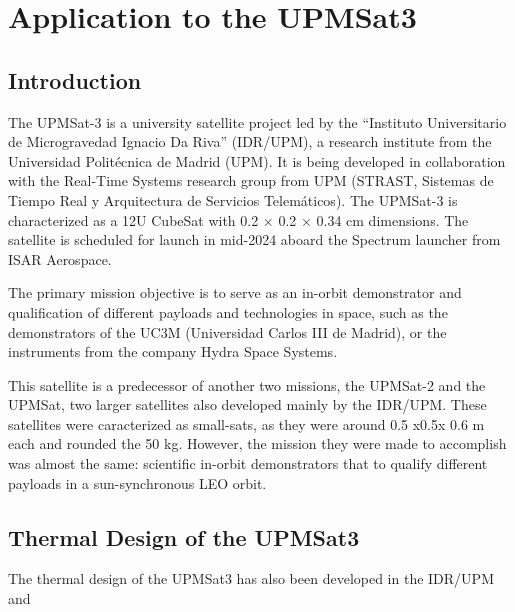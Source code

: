 \chapter{Application to the UPMSat3}\label{ch:04}
\section{Introduction}

The UPMSat-3 is a university satellite project led by the “Instituto Universitario de Microgravedad  Ignacio Da Riva” (IDR/UPM), a research institute from the Universidad Politécnica de Madrid (UPM). It is being developed in collaboration with the Real-Time Systems research group from UPM (STRAST, Sistemas de Tiempo Real y Arquitectura de Servicios Telemáticos). The UPMSat-3 is characterized as a 12U CubeSat with 0.2 × 0.2 × 0.34 cm dimensions. The satellite is scheduled for launch in mid-2024 aboard the Spectrum launcher from ISAR Aerospace. 

The primary mission objective is to serve as an in-orbit demonstrator and qualification of
different payloads and technologies in space, such as the demonstrators of the UC3M (Universidad Carlos III de Madrid), or the instruments from the company Hydra Space Systems.

This satellite is a predecessor of another two missions, the UPMSat-2 and the UPMSat, two larger satellites also developed mainly by the IDR/UPM. These satellites were caracterized as small-sats, as they were around 0.5 x0.5x 0.6 m each and rounded the 50 kg. However, the mission they were made to accomplish was almost the same: scientific in-orbit demonstrators that to qualify different payloads in a sun-synchronous LEO orbit.


\section{Thermal Design of the UPMSat3}
The thermal design of the UPMSat3 has also been developed in the IDR/UPM and 